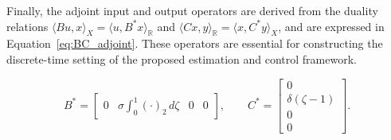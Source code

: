 Finally, the adjoint input and output operators are derived from the duality relations $\langle Bu, x \rangle_X = \langle u, B^* x \rangle_\mathbb{R}$ and $\langle Cx, y \rangle_\mathbb{R} = \langle x, C^* y \rangle_X$, and are expressed in Equation~\eqref{eq:BC_adjoint}. These operators are essential for constructing the discrete-time setting of the proposed estimation and control framework.

\begin{equation} \label{eq:BC_adjoint}
B^* = \begin{bmatrix} 0 & \sigma \int_0^1 (\cdot)_2\, d\zeta & 0 & 0 \end{bmatrix}, \qquad
C^* = \begin{bmatrix} 0 \\ \delta(\zeta - 1) \\ 0 \\ 0 \end{bmatrix}.
\end{equation}